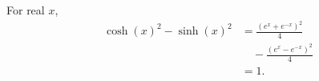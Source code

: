 \documentclass{article}
\begin{document}
For real $x$,
\begin{align}
\cosh(x)^2 - \sinh(x)^2 &= \frac{(e^{x}+e^{-x})^2}{4} \\[4pt]
&\quad - \frac{(e^{x}-e^{-x})^2}{4} \\[4pt]
&= 1 .
\label{eq:ch}
\end{align}
\end{document}
